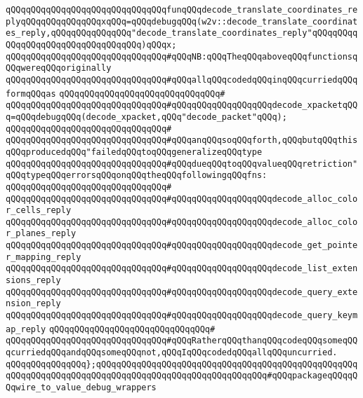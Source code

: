 \verb|qQQqqQQqqQQqqQQqqQQqqQQqqQQqqQQqfunqQQqdecode_translate_coordinates_replyqQQqqQQqqQQqqQQqxqQQq=qQQqdebugqQQq(w2v::decode_translate_coordinates_reply,qQQqqQQqqQQqqQQq"decode_translate_coordinates_reply"qQQqqQQqqQQqqQQqqQQqqQQqqQQqqQQqqQQq)qQQqx;|\newline
\newline
\verb|qQQqqQQqqQQqqQQqqQQqqQQqqQQqqQQq#qQQqNB:qQQqTheqQQqaboveqQQqfunctionsqQQqwereqQQqoriginally|\newline
\verb|qQQqqQQqqQQqqQQqqQQqqQQqqQQqqQQq#qQQqallqQQqcodedqQQqinqQQqcurriedqQQqformqQQqas|\newline
\verb|qQQqqQQqqQQqqQQqqQQqqQQqqQQqqQQq#|\newline
\verb|qQQqqQQqqQQqqQQqqQQqqQQqqQQqqQQq#qQQqqQQqqQQqqQQqqQQqdecode_xpacketqQQq=qQQqdebugqQQq(decode_xpacket,qQQq"decode_packet"qQQq);|\newline
\verb|qQQqqQQqqQQqqQQqqQQqqQQqqQQqqQQq#|\newline
\verb|qQQqqQQqqQQqqQQqqQQqqQQqqQQqqQQq#qQQqanqQQqsoqQQqforth,qQQqbutqQQqthisqQQqproducedqQQq"failedqQQqtoqQQqgeneralizeqQQqtype|\newline
\verb|qQQqqQQqqQQqqQQqqQQqqQQqqQQqqQQq#qQQqdueqQQqtoqQQqvalueqQQqretriction"qQQqtypeqQQqerrorsqQQqonqQQqtheqQQqfollowingqQQqfns:|\newline
\verb|qQQqqQQqqQQqqQQqqQQqqQQqqQQqqQQq#|\newline
\verb|qQQqqQQqqQQqqQQqqQQqqQQqqQQqqQQq#qQQqqQQqqQQqqQQqqQQqdecode_alloc_color_cells_reply|\newline
\verb|qQQqqQQqqQQqqQQqqQQqqQQqqQQqqQQq#qQQqqQQqqQQqqQQqqQQqdecode_alloc_color_planes_reply|\newline
\verb|qQQqqQQqqQQqqQQqqQQqqQQqqQQqqQQq#qQQqqQQqqQQqqQQqqQQqdecode_get_pointer_mapping_reply|\newline
\verb|qQQqqQQqqQQqqQQqqQQqqQQqqQQqqQQq#qQQqqQQqqQQqqQQqqQQqdecode_list_extensions_reply|\newline
\verb|qQQqqQQqqQQqqQQqqQQqqQQqqQQqqQQq#qQQqqQQqqQQqqQQqqQQqdecode_query_extension_reply|\newline
\verb|qQQqqQQqqQQqqQQqqQQqqQQqqQQqqQQq#qQQqqQQqqQQqqQQqqQQqdecode_query_keymap_reply|\newline
\verb|qQQqqQQqqQQqqQQqqQQqqQQqqQQqqQQq#|\newline
\verb|qQQqqQQqqQQqqQQqqQQqqQQqqQQqqQQq#qQQqRatherqQQqthanqQQqcodeqQQqsomeqQQqcurriedqQQqandqQQqsomeqQQqnot,qQQqIqQQqcodedqQQqallqQQquncurried.|\newline
\newline
\verb|qQQqqQQqqQQqqQQq};qQQqqQQqqQQqqQQqqQQqqQQqqQQqqQQqqQQqqQQqqQQqqQQqqQQqqQQqqQQqqQQqqQQqqQQqqQQqqQQqqQQqqQQqqQQqqQQqqQQqqQQq#qQQqpackageqQQqqQQqwire_to_value_debug_wrappers|\newline

